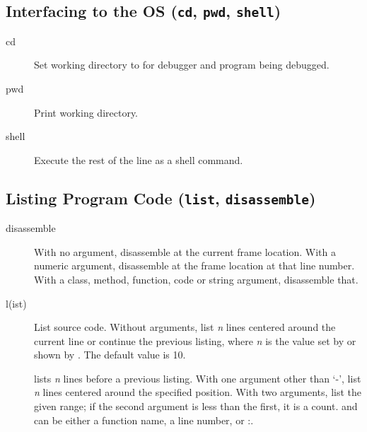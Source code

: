 \subsection{Interfacing to the OS ({\tt cd}, {\tt pwd},
  {\tt shell})\label{subsection-os}}

\begin{description}

\item[cd ]\label{command:cd}

Set working directory to  for debugger and program
being debugged.

\item[pwd]\label{command:pwd}

Print working directory.  

\item[shell ]\label{command:shell}

Execute the rest of the line as a shell command.


\end{description}

\subsection{Listing Program Code ({\tt list}, {\tt disassemble})\label{subsection-listing}}

\begin{description}

\item[disassemble ]

With no argument, disassemble at the current frame location.  With a
numeric argument, disassemble at the frame location at that line
number. With a class, method, function, code or string argument,
disassemble that.

\item[l(ist) ]\label{command:list}

List source code.  Without arguments, list
\emph{n} lines centered around the current line or continue the previous
listing, where \emph{n} is the value set by  or
shown by .  The default value is 10.

 lists \emph{n} lines before a previous listing. With one
argument other than `-', list \emph{n} lines centered around the
specified position.  With two arguments, list the given range; if the
second argument is less than the first, it is a count.  and
 can be either a function name, a line number, or
:.

\end{description}

